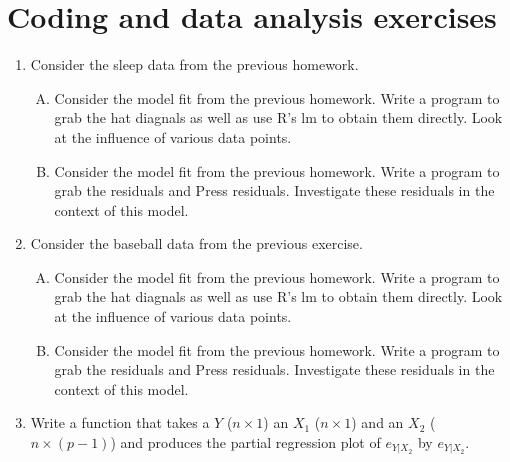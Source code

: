 \documentclass[12pt]{article}
\begin{document}
\section{Coding and data analysis exercises}
\begin{enumerate}
\item Consider the sleep data from the previous homework.
\begin{enumerate}[A.]
\item Consider the model fit from the previous homework. Write a program to grab the hat diagnals as well as use R's lm to obtain them directly. 
	Look at the influence of various data points.
\item Consider the model fit from the previous homework. Write a program to grab the residuals and Press residuals. Investigate these residuals
	in the context of this model.
\end{enumerate}
\item Consider the baseball data from the previous exercise.
\begin{enumerate}[A.]
\item Consider the model fit from the previous homework. Write a program to grab the hat diagnals as well as use R's lm to obtain them directly. 
	Look at the influence of various data points.
\item Consider the model fit from the previous homework. Write a program to grab the residuals and Press residuals. Investigate these residuals
	in the context of this model.
\end{enumerate}
\item Write a function that takes a $Y$ ($n\times 1$) an $X_1$ ($n \times 1$) and an $X_2$ ($n \times (p-1)$) and produces the partial regression
	plot of $e_{Y | X_2}$ by $e_{Y | X_2}$. 
\end{enumerate}
\end{document}
